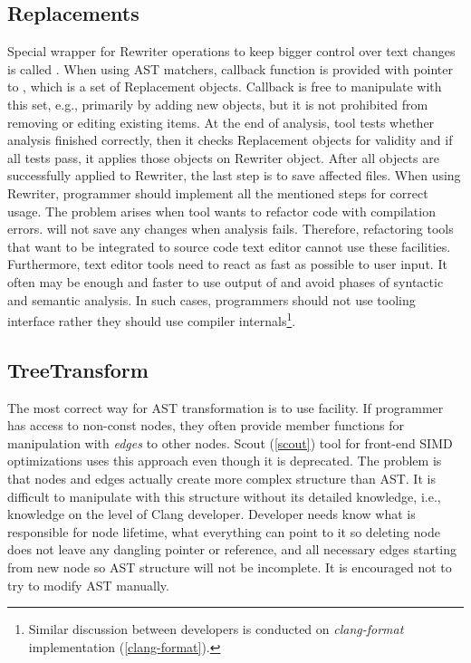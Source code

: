 \subsection{Replacements}
Special wrapper for Rewriter operations to keep bigger control over text changes is called . When using AST matchers, callback function is provided with pointer to , which is a set of Replacement objects. Callback is free to manipulate with this set, e.g., primarily by adding new objects, but it is not prohibited from removing or editing existing items. At the end of analysis, tool tests whether analysis finished correctly, then it checks Replacement objects for validity and if all tests pass, it applies those objects on Rewriter object. After all objects are successfully applied to Rewriter, the last step is to save affected files. When using Rewriter, programmer should implement all the mentioned steps for correct usage. The problem arises when tool wants to refactor code with compilation errors.  will not save any changes when analysis fails. Therefore, refactoring tools that want to be integrated to source code text editor cannot use these facilities. Furthermore, text editor tools need to react as fast as possible to user input. It often may be enough and faster to use output of  and avoid phases of syntactic and semantic analysis. In such cases, programmers should not use tooling interface rather they should use compiler internals\footnote{Similar discussion between developers is conducted on \emph{clang-format} implementation (\ref{clang-format}).}.

\subsection{TreeTransform}
The most correct way for AST transformation is to use  facility. If programmer has access to non-const nodes, they often provide member functions for manipulation with \textit{edges} to other nodes. Scout (\ref{scout}) tool for front-end SIMD optimizations uses this approach even though it is deprecated. The problem is that nodes and edges actually create more complex structure than AST. It is difficult to manipulate with this structure without its detailed knowledge, i.e., knowledge on the level of Clang developer. Developer needs know what is responsible for node lifetime, what everything can point to it so deleting node does not leave any dangling pointer or reference, and all necessary edges starting from new node so AST structure will not be incomplete. It is encouraged not to try to modify AST manually.

